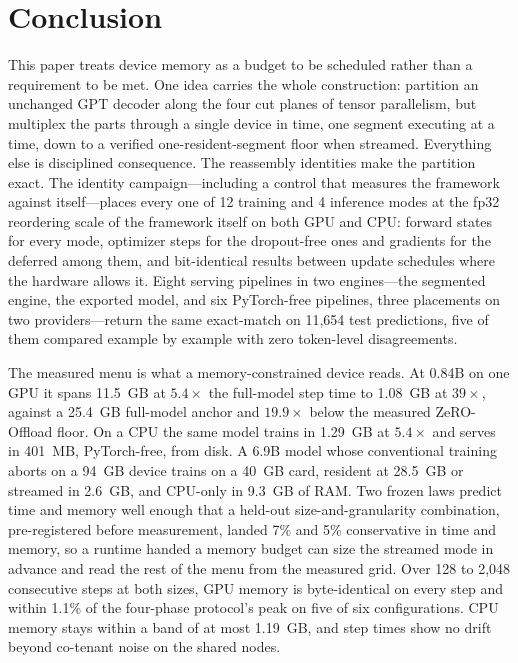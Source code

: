 \documentclass[journal]{IEEEtran}
\begin{document}
\section{Conclusion}\label{sec:conclusion}
This paper treats device memory as a budget to be scheduled rather than a
requirement to be met. One idea carries the whole construction: partition
an unchanged GPT decoder along the four cut planes of tensor parallelism,
but multiplex the parts through a single device in time, one segment
executing at a time, down to a verified one-resident-segment floor when
streamed. Everything else is disciplined consequence. The reassembly
identities make the partition exact. The identity campaign---including a
control that measures the framework against itself---places every one of 12
training and 4 inference modes at the fp32 reordering scale of the
framework itself on both GPU and CPU: forward states for every mode, optimizer
steps for the dropout-free ones and gradients for the deferred among them, and
bit-identical results
between update schedules where the hardware allows it. Eight serving pipelines in two
engines---the segmented engine, the exported model, and six PyTorch-free
pipelines, three placements on two providers---return the same exact-match on
11{,}654 test predictions, five of them compared example by example with zero
token-level disagreements.

The measured menu is what a memory-constrained device reads. At 0.84B on
one GPU it spans 11.5~GB at $5.4\times$ the full-model step time to
1.08~GB at $39\times$, against a 25.4~GB full-model anchor and
$19.9\times$ below the measured ZeRO-Offload floor. On a CPU the same
model trains in 1.29~GB at $5.4\times$ and serves in 401~MB, PyTorch-free,
from disk. A 6.9B model whose conventional training aborts on a 94~GB
device trains on a 40~GB card, resident at 28.5~GB or streamed in 2.6~GB,
and CPU-only in 9.3~GB of RAM. Two frozen laws
predict time and memory well enough that a held-out size-and-granularity
combination, pre-registered before measurement, landed 7\% and 5\%
conservative in time and memory, so a runtime handed a memory budget can size
the streamed mode in advance and read the rest of the menu from the measured
grid. Over 128 to 2{,}048 consecutive steps at both sizes, GPU memory is
byte-identical on every step and within 1.1\% of the four-phase protocol's peak
on five of six configurations. CPU memory stays within a band of at most
1.19~GB, and step times show no drift beyond co-tenant noise on the shared
nodes.
\end{document}
